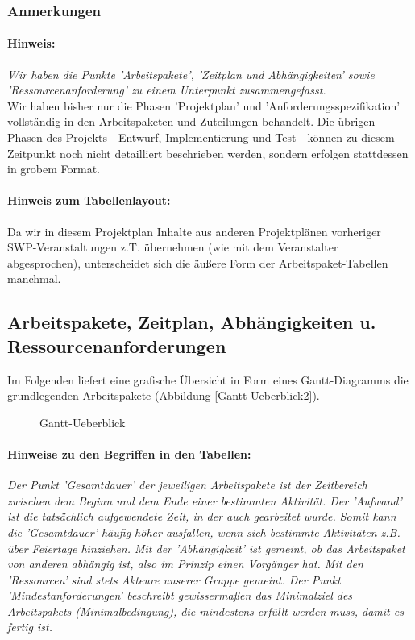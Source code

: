 \documentclass[fontsize=12pt,paper=a4,twoside]{scrartcl}
\begin{document}
\subsubsection{Anmerkungen}\label{aps}

\paragraph{Hinweis:} \textit{Wir haben die Punkte 'Arbeitspakete', 'Zeitplan und Abhängigkeiten' sowie 'Ressourcenanforderung' zu einem Unterpunkt zusammengefasst.}\\

Wir haben bisher nur die Phasen 'Projektplan' und 'Anforderungsspezifikation' vollständig in den Arbeitspaketen und Zuteilungen behandelt. Die übrigen Phasen des Projekts - Entwurf, Implementierung und Test - können zu diesem Zeitpunkt noch nicht detailliert beschrieben werden, sondern erfolgen stattdessen in grobem Format. \\

\paragraph{Hinweis zum Tabellenlayout:}Da wir in diesem Projektplan Inhalte aus anderen Projektplänen vorheriger SWP-Veranstaltungen z.T. übernehmen (wie mit dem Veranstalter abgesprochen), unterscheidet sich die äußere Form der Arbeitspaket-Tabellen manchmal. 

\subsection{Arbeitspakete, Zeitplan, Abhängigkeiten u. Ressourcenanforderungen}\label{aps}

Im Folgenden liefert eine grafische Übersicht in Form eines Gantt-Diagramms die grundlegenden Arbeitspakete (Abbildung \ref{Gantt-Ueberblick2}).\\

\begin{figure}[!h]
\caption{Gantt-Ueberblick}
\label{Gantt-Ueberblick}
\end{figure}

\newpage

\paragraph{Hinweise zu den Begriffen in den Tabellen:} \textit{Der Punkt 'Gesamtdauer' der jeweiligen Arbeitspakete ist der Zeitbereich zwischen dem Beginn und dem Ende einer bestimmten Aktivität. Der 'Aufwand' ist die tatsächlich aufgewendete Zeit, in der auch gearbeitet wurde. Somit kann die 'Gesamtdauer' häufig höher ausfallen, wenn sich bestimmte Aktivitäten z.B. über Feiertage hinziehen. Mit der 'Abhängigkeit' ist gemeint, ob das Arbeitspaket von anderen abhängig ist, also im Prinzip einen Vorgänger hat. Mit den 'Ressourcen' sind stets Akteure unserer Gruppe gemeint. Der Punkt 'Mindestanforderungen' beschreibt gewissermaßen das Minimalziel des Arbeitspakets (Minimalbedingung), die mindestens erfüllt werden muss, damit es fertig ist.}\\
\end{document}

